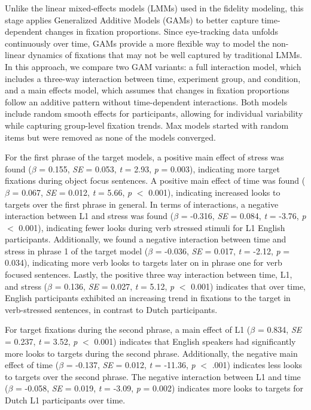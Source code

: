 Unlike the linear mixed-effects models (LMMs) used in the fidelity modeling, this stage applies Generalized Additive Models (GAMs) to better capture time-dependent changes in fixation proportions. Since eye-tracking data unfolds continuously over time, GAMs provide a more flexible way to model the non-linear dynamics of fixations that may not be well captured by traditional LMMs. In this approach, we compare two GAM variants: a full interaction model, which includes a three-way interaction between time, experiment group, and condition, and a main effects model, which assumes that changes in fixation proportions follow an additive pattern without time-dependent interactions. Both models include random smooth effects for participants, allowing for individual variability while capturing group-level fixation trends. Max models started with random items but were removed as none of the models converged.

For the first phrase of the target models, a positive main effect of stress was found ($\beta$ = 0.155, \textit{SE} = 0.053, \textit{t} = 2.93, \textit{p} = 0.003), indicating more target fixations during object focus sentences. A positive main effect of time was found ($\beta$ = 0.067, \textit{SE} = 0.012, \textit{t} = 5.66, \textit{p} $<$ 0.001), indicating increased looks to targets over the first phrase in general. In terms of interactions, a negative interaction between L1 and stress was found ($\beta$ = -0.316, \textit{SE} = 0.084, \textit{t} = -3.76, \textit{p} $<$ 0.001), indicating fewer looks during verb stressed stimuli for L1 English participants. Additionally, we found a negative interaction between time and stress in phrase 1 of the target model ($\beta$ = -0.036, \textit{SE} = 0.017, \textit{t} = -2.12, \textit{p} = 0.034), indicating more verb looks to targets later on in phrase one for verb focused sentences. Lastly, the positive three way interaction between time, L1, and stress ($\beta$ = 0.136, \textit{SE} = 0.027, \textit{t} = 5.12, \textit{p} $<$ 0.001) indicates that over time, English participants exhibited an increasing trend in fixations to the target in verb-stressed sentences, in contrast to Dutch participants.
 
 For target fixations during the second phrase, a main effect of L1 ($\beta$ = 0.834, \textit{SE} = 0.237, \textit{t} = 3.52, \textit{p} $<$ 0.001) indicates that English speakers had significantly more looks to targets during the second phrase. Additionally, the negative main effect of time ($\beta$ = -0.137, \textit{SE} = 0.012, \textit{t} = -11.36, \textit{p} $<$ .001) indicates less looks to targets over the second phrase. The negative interaction between L1 and time ($\beta$ = -0.058, \textit{SE} = 0.019, \textit{t} = -3.09, \textit{p} = 0.002) indicates more looks to targets for Dutch L1 participants over time.

